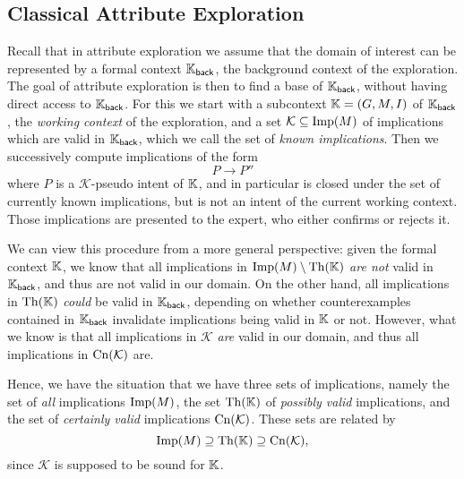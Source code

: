 \subsection{Classical Attribute Exploration}
\label{sec:class-attr-expl}

Recall that in attribute exploration we assume that the domain of interest can be
represented by a formal context ${\mathbb{K}}_{\mathsf{back}}$, the background context of the
exploration.  The goal of attribute exploration is then to find a base of ${\mathbb{K}}_{\mathsf{back}}$, without having direct access to ${\mathbb{K}}_{\mathsf{back}}$.  For this we
start with a subcontext ${\mathbb{K}} = (G, M, I)$ of ${\mathbb{K}}_{\mathsf{back}}$, the
\emph{working context} of the exploration, and a set $\mathcal{K} \subseteq \operatorname{Imp}(M)$ of
implications which are valid in ${\mathbb{K}}_{\mathsf{back}}$, which we call the set of
\emph{known implications}.  Then we successively compute implications of the form
\begin{equation*}
  P \to P''
\end{equation*}
where $P$ is a $\mathcal{K}$-pseudo intent of ${\mathbb{K}}$, and in particular is closed under
the set of currently known implications, but is not an intent of the current working
context.  Those implications are presented to the expert, who either confirms or rejects
it.

We can view this procedure from a more general perspective: given the formal context
${\mathbb{K}}$, we know that all implications in $\operatorname{Imp}(M) \setminus \operatorname{Th}({\mathbb{K}})$ \emph{are not}
valid in ${\mathbb{K}}_{\mathsf{back}}$, and thus are not valid in our domain.  On the other
hand, all implications in $\operatorname{Th}({\mathbb{K}})$ \emph{could} be valid in ${\mathbb{K}}_{\mathsf{back}}$,
depending on whether counterexamples contained in ${\mathbb{K}}_{\mathsf{back}}$ invalidate
implications being valid in ${\mathbb{K}}$ or not.  However, what we know is that all
implications in $\mathcal{K}$ \emph{are} valid in our domain, and thus all implications in
$\operatorname{Cn}(\mathcal{K})$ are.

Hence, we have the situation that we have three sets of implications, namely the set of
\emph{all} implications $\operatorname{Imp}(M)$, the set $\operatorname{Th}({\mathbb{K}})$ of \emph{possibly valid}
implications, and the set of \emph{certainly valid} implications $\operatorname{Cn}(\mathcal{K})$.
These sets are related by
\begin{equation*}
  \operatorname{Imp}(M) \supseteq \operatorname{Th}({\mathbb{K}}) \supseteq \operatorname{Cn}(\mathcal{K}),
\end{equation*}
since $\mathcal{K}$ is supposed to be sound for ${\mathbb{K}}$.

